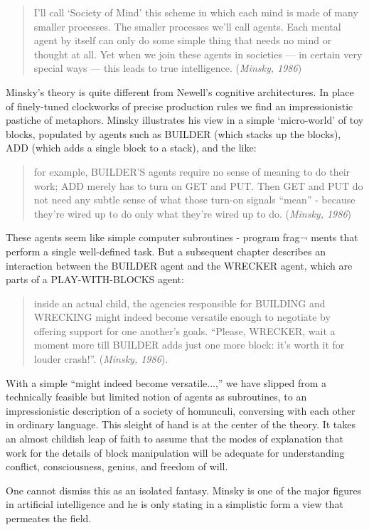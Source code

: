 \documentclass[12pt]{article}
\def\bq{\begin{quote}}
\def\eq{\end{quote}}
\begin{document}
\bq
I’ll call `Society of Mind' this scheme in which each mind is made of many smaller processes. The smaller processes we'll call agents. Each mental agent by itself can only do some simple thing that needs no mind or thought at all. Yet when we join these agents in societies --- in certain very special ways --- this leads to true intelligence. ({\it Minsky, 1986})
\eq

Minsky’s theory is quite different from Newell's cognitive architectures. In place of finely-tuned clockworks of precise production rules we find an impressionistic pastiche of metaphors. Minsky illustrates his view in a simple `micro-world' of toy blocks, populated by agents such as BUILDER (which stacks up the blocks), ADD (which adds a single block to a stack), and the like:

\bq
for example, BUILDER’S agents require no sense of meaning to do their work; ADD merely has to turn on GET and PUT. Then GET and PUT do not need any subtle sense of what those turn-on signals ``mean'' - because they’re wired up to do only what they’re wired up to do. ({\it Minsky, 1986})
\eq

These agents seem like simple computer subroutines - program frag¬ ments that perform a single well-defined task. But a subsequent chapter describes an interaction between the BUILDER agent and the WRECKER agent, which are parts of a PLAY-WITH-BLOCKS agent:

\bq
inside an actual child, the agencies responsible for BUILDING and WRECKING might indeed become versatile enough to negotiate by offering support for one another’s goals. ``Please, WRECKER, wait a moment more till BUILDER adds just one more block: it’s worth it for louder crash!''. ({\it Minsky, 1986}).
\eq

With a simple ``might indeed become versatile...,'' we have slipped from a technically feasible but limited notion of agents as subroutines, to an impressionistic description of a society of homunculi, conversing with each other in ordinary language. This sleight of hand is at the center of the theory. It takes an almost childish leap of faith to assume that the modes of
explanation that work for the details of block manipulation will be adequate for understanding conflict, consciousness, genius, and freedom of will.

One cannot dismiss this as an isolated fantasy. Minsky is one of the major figures in artificial intelligence and he is only stating in a simplistic form a view that permeates the field.
\end{document}
